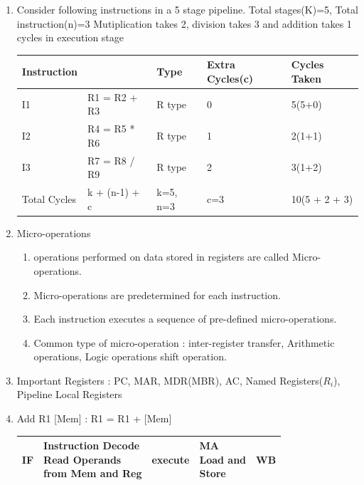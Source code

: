 \begin{enumerate}
    \item Consider following instructions in a 5 stage pipeline. Total stages(K)=5, Total instruction(n)=3
          Mutiplication takes 2, division takes 3 and addition takes 1 cycles in execution stage\\
           \begin{myTableStyle} \begin{tabular}{ |m{2cm}|m{3cm}|m{2cm}|m{3cm}|m{3cm}| } \hline
              Instruction &         & Type      & Extra Cycles(c)   & Cycles Taken  \\ \hline
              I1 &  R1 = R2 + R3    & R type    & 0                 &   5(5+0) \\ \hline
              I2 &  R4 = R5 * R6    & R type    & 1                 &   2(1+1) \\ \hline
              I3 &  R7 = R8 / R9    & R type    & 2                 &   3(1+2) \\ \hline
              Total Cycles &  k + (n-1) + c     & k=5, n=3  & c=3   &   10(5 + 2 + 3)\\ \hline
           \end{tabular} \end{myTableStyle} \vspace{0.08in}


    \newpage
    \item Micro-operations
    \begin{enumerate}
        \item operations performed on data stored in registers are called Micro-operations.
        \item Micro-operations are predetermined for each instruction.
        \item Each instruction executes a sequence of pre-defined micro-operations.
        \item Common type of micro-operation : inter-register transfer, Arithmetic operations, Logic operations
              shift operation.
    \end{enumerate}

    \item Important Registers : PC, MAR, MDR(MBR), AC, Named Registers(\(R_i\)), Pipeline Local Registers
    \item Add R1 [Mem] : R1 = R1 + [Mem] \\
    \begin{myTableStyle} \begin{tabular}{ |l|l|l|l|l| } \hline
        IF & \makecell[l]{ Instruction Decode \\ Read Operands \\from Mem and Reg}
        &execute & \makecell[l]{ MA \\ Load and \\Store}& WB   \\ \hline


\end{tabular}
\end{myTableStyle}
\end{enumerate}
